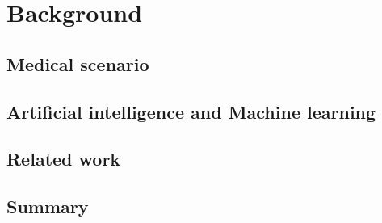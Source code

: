 \documentclass[thesis.tex]{subfiles}
\begin{document}
\chapter{Background}


\section{Medical scenario}


\section{Artificial intelligence and Machine learning}


\section{Related work}


\section{Summary}
\end{document}
